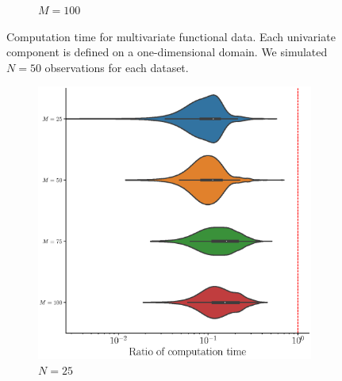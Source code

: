 \begin{results}
\begin{figure}
\begin{subfigure}[b]{0.49\textwidth}
         \caption{$M = 100$}
         \label{fig:computation_time_mfd_1d_100}
    \end{subfigure}
    \caption{Computation time for multivariate functional data. Each univariate component is defined on a one-dimensional domain. We simulated $N = 50$ observations for each dataset.}
    \label{fig:computation_time_mfd_1d}
\end{figure}

\begin{figure}
     \centering
     \begin{subfigure}[b]{0.49\textwidth}
         \centering
         \includegraphics[width=\textwidth]{figures/scenario_2/computation_time_N25.eps}
         \caption{$N = 25$}
         \label{fig:computation_time_mfd_2d_25}
     \end{subfigure}
     \hfill
     \begin{subfigure}[b]{0.49\textwidth}
         \centering

\end{subfigure}
\end{figure}
\end{results}
